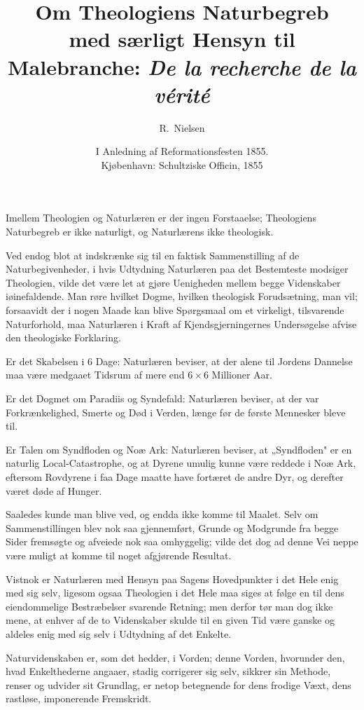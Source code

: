 \documentclass[12pt,a4paper]{article}
\title{\textbf{Om Theologiens Naturbegreb}\\[4pt]
       \large med særligt Hensyn til\\[4pt]
       \large Malebranche: \emph{De la recherche de la vérité}}
\author{R.\ Nielsen}
\date{I Anledning af Reformationsfesten 1855.\\[4pt]
  \small Kjøbenhavn: Schultziske Officin, 1855}
\newcommand{\opage}[1]{\marginnote{\footnotesize\textit{[#1]}}}
\begin{document}
\maketitle
\thispagestyle{fancy}

\bigskip


\opage{3} \noindent
Imellem Theologien og Naturlæren er der ingen Forstaaelse; Theologiens
Naturbegreb er ikke naturligt, og Naturlærens ikke theologisk.

Ved endog blot at indskrænke sig til en faktisk Sammenstilling af de
Naturbegivenheder, i hvis Udtydning Naturlæren paa det Bestemteste
modsiger Theologien, vilde det være let at gjøre Uenigheden mellem begge
Videnskaber iøinefaldende. Man røre hvilket Dogme, hvilken theologisk
Forudsætning, man vil; forsaavidt der i nogen Maade kan blive Spørgsmaal om
et virkeligt, tilsvarende Naturforhold, maa Naturlæren i Kraft af
Kjendsgjerningernes Undersøgelse afvise den theologiske Forklaring.

Er det Skabelsen i 6 Dage: Naturlæren beviser, at der alene til Jordens
Dannelse maa være medgaaet Tidsrum af mere end $6 \times 6$ Millioner Aar.

Er det Dogmet om Paradiis og Syndefald: Naturlæren beviser, at der var
Forkrænkelighed, Smerte og Død i Verden, længe før de første Mennesker
bleve til.

Er Talen om Syndfloden og Noæ Ark: Naturlæren beviser, at „Syndfloden" er
en naturlig Local-Catastrophe, og at Dyrene umulig kunne være reddede i Noæ
Ark, eftersom Rovdyrene i faa Dage maatte have fortæret de andre Dyr, og
derefter været døde af Hunger.

Saaledes kunde man blive ved, og endda ikke komme til Maalet. Selv om
Sammenstillingen blev nok saa gjennemført, Grunde og Modgrunde fra begge
Sider fremsøgte og afveiede nok saa omhyggelig; vilde det dog ad denne Vei
neppe være muligt at komme til noget afgjørende Resultat.

\opage{4} Vistnok er Naturlæren med Hensyn paa Sagens Hovedpunkter i det Hele enig med
sig selv, ligesom ogsaa Theologien i det Hele maa siges at følge en til dens
eiendommelige Bestræbelser svarende Retning; men derfor tør man dog ikke
mene, at enhver af de to Videnskaber skulde til en given Tid være ganske og
aldeles enig med sig selv i Udtydning af det Enkelte.

Naturvidenskaben er, som det hedder, i Vorden; denne Vorden, hvorunder den,
hvad Enkelthederne angaaer, stadig corrigerer sig selv, sikkrer sin Methode,
renser og udvider sit Grundlag, er netop betegnende for dens frodige Væxt,
dens rastløse, imponerende Fremskridt.
\end{document}
